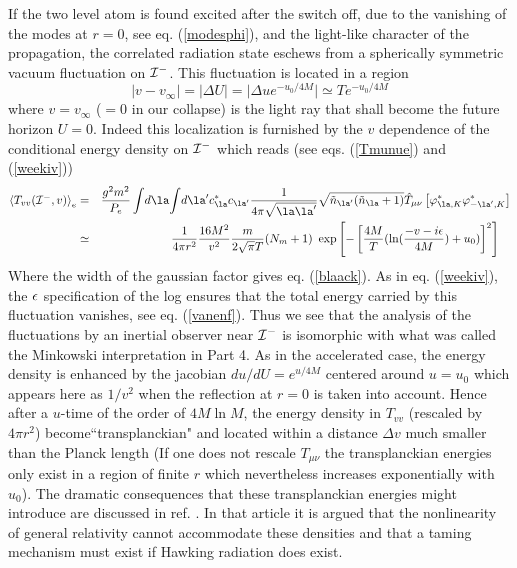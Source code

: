 \documentclass[12pt]{article}
\begin{document}
If the two level atom is found excited after
the switch off, due to the vanishing of the modes at $r=0$, see eq.
(\ref{modesphi}), and the light-like character of the propagation, the
correlated radiation state eschews from
a spherically symmetric vacuum fluctuation on ${\cal
I}^-$.
This fluctuation
is located in a region
\begin{equation}
\vert v  -
v_\infty\vert=\vert \Delta U\vert=\vert {\Delta u e^{- u_0 / 4 M}}\vert
\simeq T e^{- u_0 / 4 M}
\label{blaack}
\end{equation}
where $v = v_\infty$ ($=0$ in our
collapse) is the light ray that
shall become the
future horizon $U=0$.
Indeed this localization is furnished by the
$v$ dependence of the
conditional energy density
 on ${\cal I}^-$ which reads (see eqs. (\ref{Tmunue}) and (\ref{weekiv}))
\begin{eqnarray}
\bk{T_{vv}({\cal I^-},v)}_{e}
&=& { g^2 m^2 \over P_{e}} \int\! d\la \!\int
\!d\la^\prime c_\la^* c_{\la^\prime}
{1 \over 4 \pi \sqrt{\la\la^\prime} }\sqrt{
\tilde n_{\la^\prime} ( \tilde n_\la +1)
}\hat T_{\mu
\nu }
\left[
 \varphi^*_{\la,K}
\varphi^*_{-\la^\prime,K}\right]
\nonumber\\
&\simeq & {1 \over 4 \pi r^2}{16 M^2 \over v^2} {m  \over  2 \sqrt{\pi} T }
(N_{m} +1)\ \exp \left[
-\left[
{ 4 M  \over T}  (  \ln ({-v-i\e
\over 4M}) + u_0 )
\right]^2\right]\quad
\label{epsilfr}
\end{eqnarray}
Where the width of the gaussian factor gives eq. (\ref{blaack}).
As in eq. (\ref{weekiv}), the $\mbox{$ \epsilon $}$ specification of the log ensures
that the total energy carried by this fluctuation vanishes, see eq.
(\ref{vanenf}).
Thus
we see that the analysis of the fluctuations by an inertial observer near
${\cal I}^-$ is isomorphic with what was called the Minkowski interpretation
in Part 4.
 As in the accelerated case, the energy density is
enhanced
by the jacobian $du/dU= e^{u / 4 M}$ centered around $u=u_0$ which appears here
as
$1/v^2$ when the reflection at $r=0$ is taken into account. Hence after a
$u$-time of the order of $4M \ln M$, the energy density in $T_{vv}$
(rescaled by $ 4 \pi r^2$)
become``transplanckian" and located within a
distance $\Delta v$ much smaller than the Planck length
(If one does not rescale $T_{\mu\nu}$
the transplanckian energies only exist in a region of finite $r$
which nevertheless increases exponentially with $u_0$).
The dramatic consequences that these transplanckian energies might introduce
are discussed in ref. \cite{EMP}. In that article it is argued that the
nonlinearity of general relativity cannot accommodate these densities and
that  a taming mechanism must exist if Hawking radiation does exist.
\end{document}

